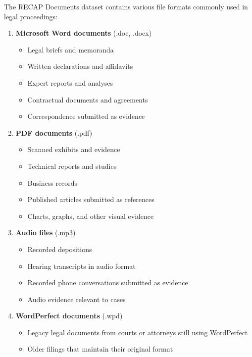 The RECAP Documents dataset contains various file formats commonly used in legal proceedings:

\begin{enumerate}
    \item \textbf{Microsoft Word documents} (.doc, .docx)
    \begin{itemize}
        \item Legal briefs and memoranda
        \item Written declarations and affidavits
        \item Expert reports and analyses
        \item Contractual documents and agreements
        \item Correspondence submitted as evidence
    \end{itemize}
    
    \item \textbf{PDF documents} (.pdf)
    \begin{itemize}
        \item Scanned exhibits and evidence
        \item Technical reports and studies
        \item Business records
        \item Published articles submitted as references
        \item Charts, graphs, and other visual evidence
    \end{itemize}
    
    \item \textbf{Audio files} (.mp3)
    \begin{itemize}
        \item Recorded depositions
        \item Hearing transcripts in audio format
        \item Recorded phone conversations submitted as evidence
        \item Audio evidence relevant to cases
    \end{itemize}
    
    \item \textbf{WordPerfect documents} (.wpd)
    \begin{itemize}
        \item Legacy legal documents from courts or attorneys still using WordPerfect
        \item Older filings that maintain their original format
    \end{itemize}
\end{enumerate}

